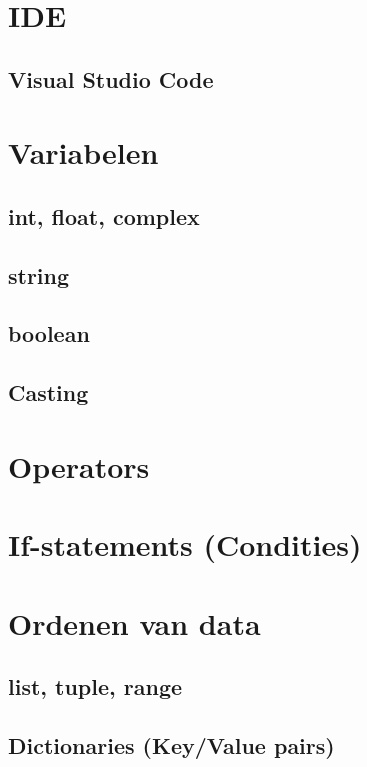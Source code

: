 \documentclass[a4paper,12pt,twoside,openright,titlepage]{book}
\begin{document}
\chapter{IDE}
\section{Visual Studio Code}

\chapter{Variabelen}
\section{int, float, complex}
\section{string}
\section{boolean}
\section{Casting}


\chapter{Operators}

\chapter{If-statements (Condities)}

\chapter{Ordenen van data}
\section{list, tuple, range}
\section{Dictionaries (Key/Value pairs)}
\end{document}
